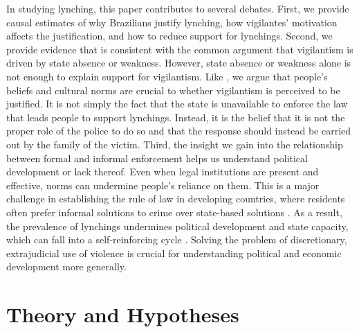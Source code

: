 \documentclass[12pt,a4paper]{article}
\begin{document}
In studying lynching, this  paper contributes to several debates. First, we provide causal estimates of why Brazilians justify lynching, how vigilantes' motivation affects the justification, and how to reduce support for lynchings. Second, we provide evidence that is consistent with the common argument that vigilantism is driven by state absence or weakness. However, state absence or weakness alone is not enough to explain support for vigilantism. Like \cite{jung2020lynching}, we argue that people's beliefs and cultural norms are crucial to whether vigilantism is perceived to be justified. It is not simply the fact that the state is unavailable to enforce the law that leads people to support lynchings. Instead, it is the belief that it is not the proper role of the police to do so and that the response should instead be carried out by the family of the victim. Third, the insight we gain into the relationship between formal and informal enforcement helps us understand political development or lack thereof. Even when legal institutions are present and effective, norms  can undermine people's reliance on them. This is a major challenge in establishing the rule of law in developing countries, where residents often prefer informal solutions to crime over state-based solutions \citep[10]{blair2020peacekeeping}. As a result, the prevalence of lynchings undermines political development and state capacity, which can fall into a self-reinforcing cycle \citep{jung2020lynching}. Solving the problem of discretionary, extrajudicial use of violence is crucial for understanding political and economic development more generally. 

\section{Theory and Hypotheses}
\label{sec:theory}
\end{document}
